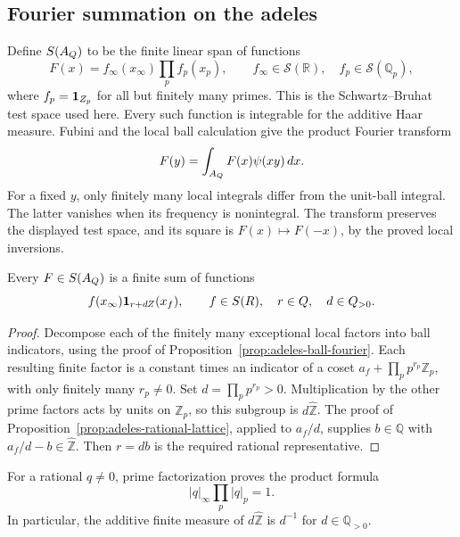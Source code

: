 \subsection{Fourier summation on the adeles}
\label{sec:adeles-poisson}

Define \(S(A_{Q})\) to be the finite linear span of functions
\[
 F(x)=f_\infty(x_\infty)\prod_p f_p(x_p),
 \qquad f_\infty\in\mathcal S(\mathbb R),\quad
 f_p\in\mathcal S(\mathbb Q_p),
\]
where \(f_p=\mathbf 1_{Z_p}\) for all but finitely many primes.
This is the Schwartz--Bruhat test space used here.
Every such function is integrable for the additive Haar measure.
Fubini and the local ball calculation give the product Fourier transform
\[
 F(y)=\int_{A_{Q}}F(x)\psi(xy)\,dx.
\]
For a fixed \(y\), only finitely many local integrals differ from the
unit-ball integral. The latter vanishes when its frequency is nonintegral.
The transform preserves the displayed test space, and its square is
\(F(x)\mapsto F(-x)\), by the proved local inversions.

\begin{lemma}
\label{lem:adeles-elementary-tests}
Every \(F\in S(A_{Q})\) is a finite sum of functions
\[
 f(x_\infty)\mathbf 1_{r+dZ}(x_f),
 \qquad f\in S(R),\quad r\in Q,\quad
 d\in Q_{>0}.
\]
\end{lemma}

\begin{proof}
Decompose each of the finitely many exceptional local factors into ball
indicators, using the proof of Proposition~\ref{prop:adeles-ball-fourier}.
Each resulting finite factor is a constant times an indicator of a coset
\(a_f+\prod_p p^{r_p}\mathbb Z_p\), with only finitely many \(r_p\neq0\).
Set \(d=\prod_p p^{r_p}>0\). Multiplication by the other prime factors
acts by units on \(\mathbb Z_p\), so this subgroup is \(d\widehat{\mathbb Z}\).
The proof of Proposition~\ref{prop:adeles-rational-lattice}, applied to
\(a_f/d\), supplies \(b\in\mathbb Q\) with \(a_f/d-b\in\widehat{\mathbb Z}\).
Then \(r=db\) is the required rational representative.
\end{proof}

For a rational \(q\neq0\), prime factorization proves the product formula
\begin{equation}
 |q|_\infty\prod_p|q|_p=1.
 \label{eq:adeles-product-formula}
\end{equation}
In particular, the additive finite measure of \(d\widehat{\mathbb Z}\) is \(d^{-1}\)
for \(d\in\mathbb Q_{>0}\).

